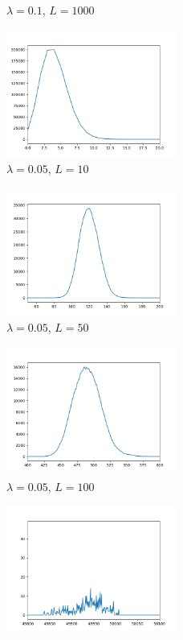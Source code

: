 \documentclass[11pt]{article}
\begin{document}
\begin{enumerate}
\begin{figure}
        \caption{$\lambda = 0.1$, $L = 1000$}
    \end{figure}
    \begin{figure}
        \centering
        \includegraphics[width=0.5\textwidth]{Figure_5.png}
        \caption{$\lambda = 0.05$, $L = 10$}
    \end{figure}
    \begin{figure}
        \centering
        \includegraphics[width=0.5\textwidth]{Figure_6.png}
        \caption{$\lambda = 0.05$, $L = 50$}
    \end{figure}
    \begin{figure}
        \centering
        \includegraphics[width=0.5\textwidth]{Figure_7.png}
        \caption{$\lambda = 0.05$, $L = 100$}
    \end{figure}
    \begin{figure}
        \centering
        \includegraphics[width=0.5\textwidth]{Figure_8.png}

\end{figure}
\end{enumerate}
\end{document}
